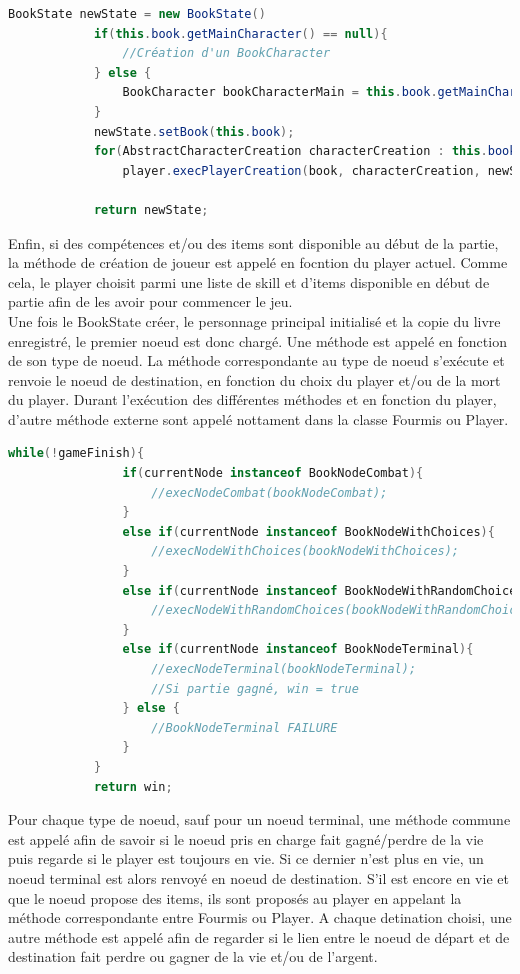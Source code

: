 		\begin{lstlisting}[gobble=12, language=java]
			BookState newState = new BookState()
			if(this.book.getMainCharacter() == null){
				//Création d'un BookCharacter
			} else {
				BookCharacter bookCharacterMain = this.book.getMainCharacter();
			}
			newState.setBook(this.book);
			for(AbstractCharacterCreation characterCreation : this.book.getCharacterCreations())
				player.execPlayerCreation(book, characterCreation, newState);

			return newState;
		\end{lstlisting}
		Enfin, si des compétences et/ou des items sont disponible au début de la partie, la méthode de création de joueur est appelé en focntion du player actuel. Comme cela, le player choisit parmi une liste de skill et d'items disponible en début de partie afin de les avoir pour commencer le jeu.\\
		Une fois le BookState créer, le personnage principal initialisé et la copie du livre enregistré, le premier noeud est donc chargé. Une méthode est appelé en fonction de son type de noeud. La méthode correspondante au type de noeud s'exécute et renvoie le noeud de destination, en fonction du choix du player et/ou de la mort du player. Durant l'exécution des différentes méthodes et en fonction du player, d'autre méthode externe sont appelé nottament dans la classe Fourmis ou Player.

		\begin{lstlisting}[gobble=12, language=java]
			while(!gameFinish){
				if(currentNode instanceof BookNodeCombat){
					//execNodeCombat(bookNodeCombat);
				}
				else if(currentNode instanceof BookNodeWithChoices){
					//execNodeWithChoices(bookNodeWithChoices);
				}
				else if(currentNode instanceof BookNodeWithRandomChoices){
					//execNodeWithRandomChoices(bookNodeWithRandomChoices);
				}
				else if(currentNode instanceof BookNodeTerminal){
					//execNodeTerminal(bookNodeTerminal);
					//Si partie gagné, win = true
				} else {
					//BookNodeTerminal FAILURE
				}
			}
			return win;
		\end{lstlisting}

		Pour chaque type de noeud, sauf pour un noeud terminal, une méthode commune est appelé afin de savoir si le noeud pris en charge fait gagné/perdre de la vie puis regarde si le player est toujours en vie. Si ce dernier n'est plus en vie, un noeud terminal est alors renvoyé en noeud de destination. S'il est encore en vie et que le noeud propose des items, ils sont proposés au player en appelant la méthode correspondante entre Fourmis ou Player. A chaque detination choisi, une autre méthode est appelé afin de regarder si le lien entre le noeud de départ et de destination fait perdre ou gagner de la vie et/ou de l'argent.

